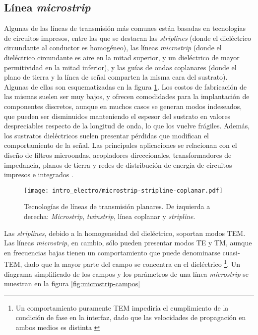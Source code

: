 \subsection{Línea \textit{microstrip}}

Algunas de las líneas de transmisión más comunes están basadas en tecnologías de circuitos impresos, entre las que se destacan las \textit{striplines} (donde el dieléctrico circundante al conductor es homogéneo), las líneas \textit{microstrip} (donde el dieléctrico circundante es aire en la mitad superior, y un dieléctrico de mayor permitividad en la mitad inferior), y las guías de ondas coplanares (donde el plano de tierra y la línea de señal comparten la misma cara del sustrato). Algunas de ellas son esquematizadas en la figura \ref{fig:strip-line-technology}. Los costos de fabricación de las mismas suelen ser muy bajos, y ofrecen comodidades para la implantación de componentes discretos, aunque en muchos casos se generan modos indeseados, que pueden ser disminuidos manteniendo el espesor del sustrato en valores despreciables respecto de la longitud de onda, lo que los vuelve frágiles. Además, los sustratos dieléctricos suelen presentar pérdidas que modifican el comportamiento de la señal. Las principales aplicaciones se relacionan con el diseño de filtros microondas, acopladores direccionales, transformadores de impedancia, planos de tierra y redes de distribución de energía de circuitos impresos e integrados \cite{Venkateswaran:Thesis}.


\begin{figure}[htp]
	\centering
	\texttt{[image: intro\_electro/microstrip-stripline-coplanar.pdf]}
	\caption{Tecnologías de líneas de transmisión planares. De izquierda a derecha: \textit{Microstrip}, \textit{twinstrip}, línea coplanar y \textit{stripline}.}
	\label{fig:strip-line-technology}
\end{figure}

Las \textit{striplines}, debido a la homogeneidad del dieléctrico, soportan modos TEM. Las líneas \textit{microstrip}, en cambio, sólo pueden presentar modos TE y TM, aunque en frecuencias bajas tienen un comportamiento que puede denominarse cuasi-TEM, dado que la mayor parte del campo se concentra en el dieléctrico \footnote{Un comportamiento puramente TEM impediría el cumplimiento de la condición de fase en la interfaz, dado que las velocidades de propagación en ambos medios es distinta \cite{Pozar:MwEngineering}}. Un diagrama simplificado de los campos y los parámetros de una línea \textit{microstrip} se muestran en la figura \ref{fig:microstrip-campos}


